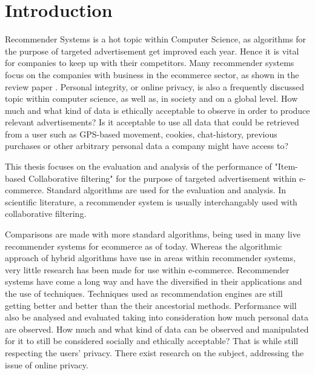 \chapter{Introduction}
Recommender Systems is a hot topic within Computer Science, as algorithms for the purpose of targeted advertisement get improved each year. Hence it is vital for companies to keep up with their competitors. Many recommender systems focus on the companies with business in the ecommerce sector, as shown in the review paper \cite{Park2012}. Personal integrity, or online privacy, is also a frequently discussed topic within computer science, as well as, in society and on a global level. How much and what kind of data is ethically acceptable to observe in order to produce relevant advertisements? Is it acceptable to use all data that could be retrieved from a user such as GPS-based movement, cookies, chat-history, previous purchases or other arbitrary personal data a company might have access to?

This thesis focuses on the evaluation and analysis of the performance of "Item-based Collaborative filtering" for the purpose of targeted advertisement within e-commerce. Standard algorithms are used for the evaluation and analysis. In scientific literature, a recommender system is usually interchangably used with collaborative filtering.

Comparisons are made with more standard algorithms, being used in many live recommender systems for ecommerce as of today. Whereas the algorithmic approach of hybrid algorithms have use in areas within recommender systems, very little research has been made for use within e-commerce. Recommender systems have come a long way and have the diversified in their applications and the use of techniques. Techniques used as recommendation engines are still getting better and better than the their ancestorial methods. Performance will also be analysed and evaluated taking into consideration how much personal data are observed. How much and what kind of data can be observed and manipulated for it to still be considered socially and ethically acceptable? That is while still respecting the users’ privacy. There exist research‌​ on the subject, addressing the‌​ issue of online‌​ privacy. 


